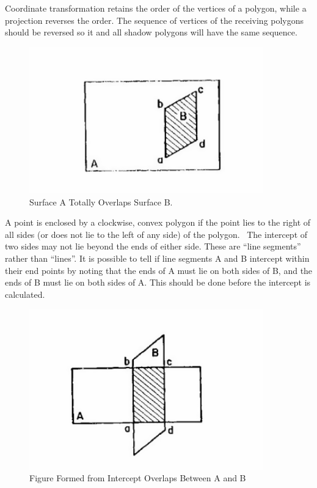 Coordinate transformation retains the order of the vertices of a polygon, while a projection reverses the order. The sequence of vertices of the receiving polygons should be reversed so it and all shadow polygons will have the same sequence.

\begin{figure}[hbtp] %
\centering
\includegraphics[width=0.9\textwidth, height=0.9\textheight, keepaspectratio=true]{media/image638.png}
\caption{Surface A Totally Overlaps Surface B. \protect \label{fig:surface-a-totally-overlaps-surface-b.}}
\end{figure}

A point is enclosed by a clockwise, convex polygon if the point lies to the right of all sides (or does not lie to the left of any side) of the polygon.~ The intercept of two sides may not lie beyond the ends of either side. These are ``line segments'' rather than ``lines''. It is possible to tell if line segments A and B intercept within their end points by noting that the ends of A must lie on both sides of B, and the ends of B must lie on both sides of A. This should be done before the intercept is calculated.

\begin{figure}[hbtp] %
\centering
\includegraphics[width=0.9\textwidth, height=0.9\textheight, keepaspectratio=true]{media/image639.png}
\caption{Figure Formed from Intercept Overlaps Between A and B \protect \label{fig:figure-formed-from-intercept-overlaps-between}}
\end{figure}

